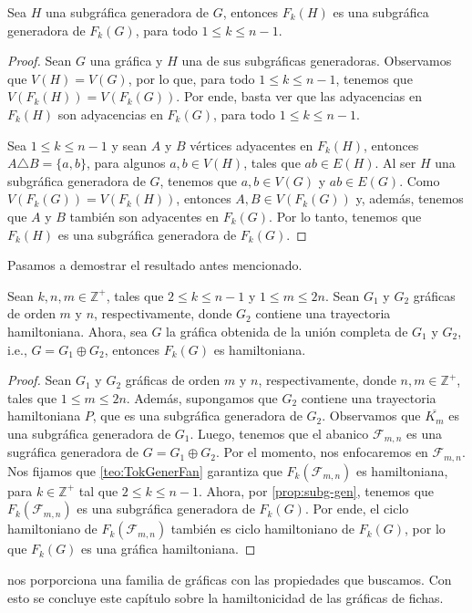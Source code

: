 \begin{proposicion}
\label{prop:subg-gen}
    Sea $H$ una subgr\'afica generadora de $G$, entonces $F_k(H)$ es una
    subgr\'afica generadora de $F_k(G)$, para todo $1 \leq k \leq n-1$.
\end{proposicion}

\begin{proof}
    Sean $G$ una gr\'afica y $H$ una de sus subgr\'aficas generadoras.
    Observamos que $V(H)=V(G)$, por lo que, para todo $1 \leq k \leq n-1$,
    tenemos que $V(F_k(H))=V(F_k(G))$. Por ende, basta ver que las adyacencias
    en $F_k(H)$ son adyacencias en $F_k(G)$, para todo $1 \leq k \leq n-1$.

    Sea $1 \leq k \leq n-1$ y sean $A$ y $B$ v\'ertices adyacentes en $F_k(H)$,
    entonces $ A \triangle B = \{a,b\}$, para algunos $a,b \in V(H)$, tales que
    $ab \in E(H)$. Al ser $H$ una subgr\'afica generadora de $G$, tenemos que
    $a,b \in V(G)$ y $ab \in E(G)$. Como $V(F_k(G))=V(F_k(H))$, entonces $A,B
    \in V(F_k(G))$ y, adem\'as, tenemos que $A$ y $B$ tambi\'en son adyacentes
    en $F_k(G)$. Por lo tanto, tenemos que $F_k(H)$ es una subgr\'afica
    generadora de $F_k(G)$.
\end{proof}

Pasamos a demostrar el resultado antes mencionado.

\begin{corolario}
\label{coro:Token-Join}
    Sean $k,n,m \in \mathbb{Z^{+}}$, tales que $2 \leq k \leq n-1$ y $1 \leq m
    \leq 2n$. Sean $G_1$ y $G_2$ gr\'aficas de orden $m$ y $n$, respectivamente,
    donde $G_2$ contiene una trayectoria hamiltoniana. Ahora, sea $G$ la
    gr\'afica obtenida de la uni\'on completa de $G_1$ y $G_2$, i.e., $G = G_1
    \oplus G_2$, entonces $F_k(G)$ es hamiltoniana. 
\end{corolario}

\begin{proof}
    Sean $G_1$ y $G_2$ gr\'aficas de orden $m$ y $n$, respectivamente, donde
    $n,m \in \mathbb{Z^{+}}$, tales que $1 \leq m \leq 2n$. Adem\'as, supongamos
    que $G_2$ contiene una trayectoria hamiltoniana $P$, que es una subgr\'afica
    generadora de $G_2$. Observamos que $\overline{K_m}$ es una subgr\'afica
    generadora de $G_1$. Luego, tenemos que el abanico $\mathcal{F}_{m,n}$ es
    una sugr\'afica generadora de $G= G_1 \oplus G_2$. Por el momento, nos
    enfocaremos en $\mathcal{F}_{m,n}$. Nos fijamos que \cref{teo:TokGenerFan}
    garantiza que $F_k(\mathcal{F}_{m,n})$ es hamiltoniana, para $k \in
    \mathbb{Z^{+}}$ tal que $2 \leq k \leq n-1$. Ahora, por
    \cref{prop:subg-gen}, tenemos que $F_k(\mathcal{F}_{m,n})$ es una
    subgr\'afica generadora de $F_k(G)$. Por ende, el ciclo hamiltoniano de
    $F_k(\mathcal{F}_{m,n})$ tambi\'en es ciclo hamiltoniano de $F_k(G)$, por lo
    que $F_k(G)$ es una gr\'afica hamiltoniana.
\end{proof}

 nos porporciona una familia de gr\'aficas con las
propiedades que buscamos. Con esto se concluye este cap\'itulo sobre la
hamiltonicidad de las gr\'aficas de fichas.
